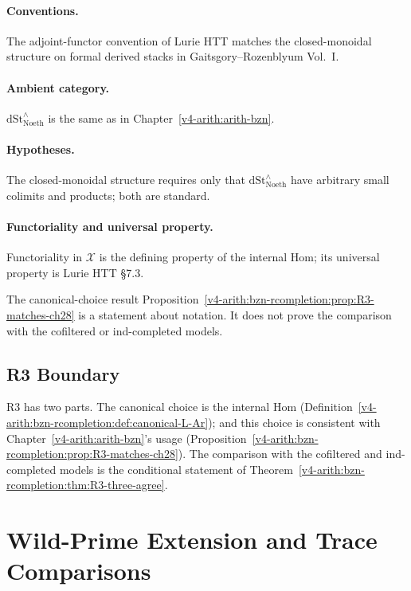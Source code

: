\paragraph{Conventions.} The adjoint-functor convention of Lurie HTT
matches the closed-monoidal structure on formal derived stacks
in Gaitsgory--Rozenblyum Vol.~I.

\paragraph{Ambient category.} \(\mathrm{dSt}^{\wedge}_{\mathrm{Noeth}}\)
is the same as in Chapter~\ref{v4-arith:arith-bzn}.

\paragraph{Hypotheses.} The closed-monoidal
structure requires only that \(\mathrm{dSt}^{\wedge}_{\mathrm{Noeth}}\)
have arbitrary small colimits and products; both are standard.

\paragraph{Functoriality and universal property.}
Functoriality in \(\mathcal{X}\) is the defining property of the
internal Hom; its universal property is Lurie HTT \S 7.3.

The canonical-choice result
Proposition~\ref{v4-arith:bzn-rcompletion:prop:R3-matches-ch28} is a statement
about notation. It does not prove the comparison with the cofiltered
or ind-completed models.

\subsection{R3 Boundary}

R3 has two parts. The canonical choice is the internal Hom
(Definition~\ref{v4-arith:bzn-rcompletion:def:canonical-L-Ar}); and this
choice is consistent with Chapter~\ref{v4-arith:arith-bzn}'s
usage (Proposition~\ref{v4-arith:bzn-rcompletion:prop:R3-matches-ch28}). The
comparison with the cofiltered and ind-completed models is the
conditional statement of
Theorem~\ref{v4-arith:bzn-rcompletion:thm:R3-three-agree}.

\section{Wild-Prime Extension and Trace Comparisons}
\label{v4-arith:bzn-rcompletion:R4}

